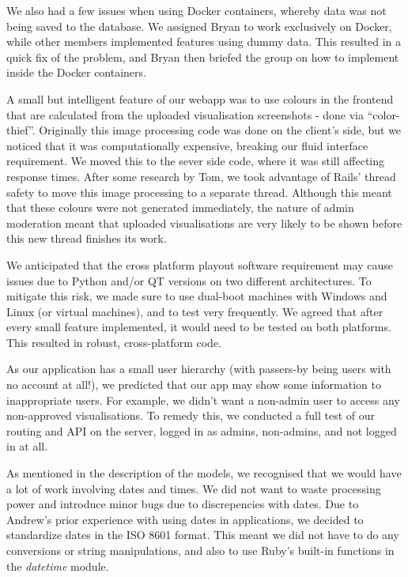 \documentclass[a4paper, titlepage]{article}
\begin{document}
We also had a few issues when using Docker containers, whereby data was not being saved to the database.
We assigned Bryan to work exclusively on Docker, while other members implemented features using dummy 
data. This resulted in a quick fix of the problem, and Bryan then briefed the group on how to implement
inside the Docker containers. 

A small but intelligent feature of our webapp was to use colours in the frontend that are calculated 
from the uploaded visualisation screenshots - done via ``color-thief''. Originally this image
processing code was done on the client's side, but we noticed that it was computationally expensive,
breaking our fluid interface requirement. We moved this to the sever side code, where it was still 
affecting response times. After some research by Tom, we took advantage of Rails' thread safety to move
this image processing to a separate thread. Although this meant that these colours were not generated 
immediately, the nature of admin moderation meant that uploaded visualisations are very likely to be 
shown before this new thread finishes its work.



We anticipated that the cross platform playout software requirement may cause issues due to Python
and/or QT versions on two different architectures. To mitigate this risk, we made sure to use dual-boot
machines with Windows and Linux (or virtual machines), and to test very frequently. We agreed that after
every small feature implemented, it would need to be tested on both platforms. This resulted in robust, 
cross-platform code.

As our application has a small user hierarchy (with passers-by being users with no account at all!), we 
predicted that our app may show some information to inappropriate users. For example, we didn't want a 
non-admin user to access any non-approved visualisations. To remedy this, we conducted a full test of
our routing and API on the server, logged in as admins, non-admins, and not logged in at all. 

As mentioned in the description of the models, we recognised that we would have a lot of work involving
dates and times. We did not want to waste processing power and introduce minor bugs due to 
discrepencies with dates. Due to Andrew's prior experience with using dates in applications, we decided 
to standardize dates in the ISO 8601 format. This meant we did not have to do any conversions or string
manipulations, and also to use Ruby's built-in functions in the \textit{datetime} module. 
\end{document}
